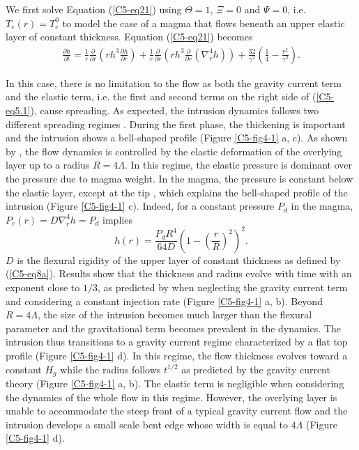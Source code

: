 We first solve Equation  (\ref{C5-eq21}) using $\Theta=1$, $\Xi=0$ and
$\Psi=0$,  i.e. $T_e(r)=T_{e}^0$  to model  the case  of a  magma that
flows beneath an  upper elastic layer of  constant thickness. Equation
(\ref{C5-eq21}) becomes
\begin{eqnarray}
  \frac{\partial h}{\partial t}=\frac{1}{r} \frac{\partial}{\partial r}\left (rh^{3} \frac{\partial h}{\partial r} \right)+ \frac{1}{r}\frac{\partial}{\partial r}\left ( rh^{3} \frac{\partial}{\partial r}\left ( \nabla^{4}_{r}h \right )\right)+\frac{32}{\gamma^{2}} \left(\frac{1}{4}-\frac{r^{2}}{\gamma^{2}}\right).
  \label{C5-eq5.1}
\end{eqnarray}

In this case, there  is no limitation to the flow  as both the gravity
current term and the elastic term,  i.e. the first and second terms on
the right side of (\ref{C5-eq5.1}),  cause spreading. As expected, the
intrusion   dynamics   follows   two   different   spreading   regimes
\citep{Michaut:2011kg,Michaut:2013dr,Bunger:2011cb}.  During the first
phase,  the  thickening  is  important   and  the  intrusion  shows  a
bell-shaped  profile  (Figure  \ref{C5-fig4-1}  a, c).   As  shown  by
\citet{Michaut:2011kg}, the flow dynamics is controlled by the elastic
deformation of  the overlying  layer up to  a radius  $R=4\Lambda$. In
this regime, the elastic pressure is dominant over the pressure due to
magma weight. In the magma, the pressure is constant below the elastic
layer, except  at the tip  \citep{Bunger:2011cb,Michaut:2011kg}, which
explains   the   bell-shaped   profile  of   the   intrusion   (Figure
\ref{C5-fig4-1}  c). Indeed,  for  a constant  pressure  $P_d$ in  the
magma, $P_e(r)=D\nabla_r^4h=P_d$ implies
\begin{equation}
  h(r)=\frac{P_{d} R^{4}}{64D}\left(1-\left(\frac{r}{R}\right)^2\right)^2.
  \label{C5-eq4-1}
\end{equation}
$D$ is the flexural rigidity of  the upper layer of constant thickness
as defined  by (\ref{C5-eq8a}).  Results  show that the  thickness and
radius evolve with time with an  exponent close to $1/3$, as predicted
by \citet{Michaut:2011kg} when neglecting the gravity current term and
considering  a  constant  injection rate  (Figure  \ref{C5-fig4-1}  a,
b). Beyond $R=4\Lambda$, the size of the intrusion becomes much larger
than  the  flexural  parameter  and  the  gravitational  term  becomes
prevalent in the dynamics. The intrusion thus transitions to a gravity
current   regime  characterized   by  a   flat  top   profile  (Figure
\ref{C5-fig4-1} d).  In this regime, the flow thickness evolves toward
a constant  $H_g$ while the  radius follows $t^{1/2}$ as  predicted by
the    gravity    current   theory    \citep{Huppert:1982a}    (Figure
\ref{C5-fig4-1} a, b). The elastic term is negligible when considering
the dynamics of the whole flow in this regime.  However, the overlying
layer is  unable to accommodate the  steep front of a  typical gravity
current flow \citep{Huppert:1982a} and  the intrusion develops a small
scale  bent   edge  whose  width   is  equal  to   $4\Lambda$  (Figure
\ref{C5-fig4-1} d).
		
